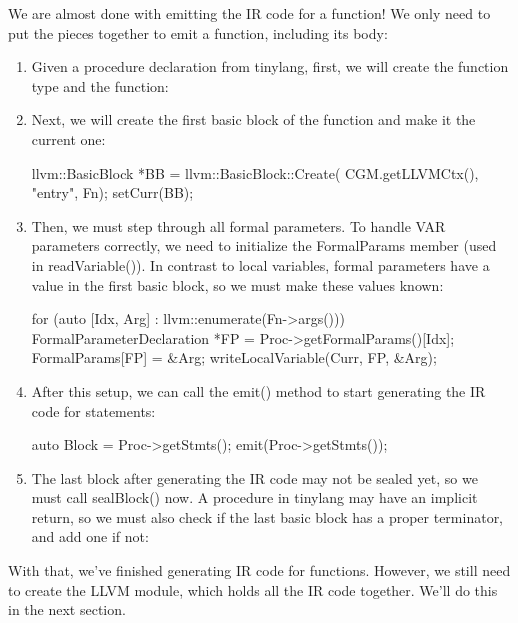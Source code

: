 We are almost done with emitting the IR code for a function! We only need to put the pieces together to emit a function, including its body:

\begin{enumerate}
\item
Given a procedure declaration from tinylang, first, we will create the function type and the function:

\begin{cpp}
void CGProcedure::run(ProcedureDeclaration *Proc) {
    this->Proc = Proc;
    Fty = createFunctionType(Proc);
    Fn = createFunction(Proc, Fty);
\end{cpp}

\item
Next, we will create the first basic block of the function and make it the current one:

\begin{cpp}
    llvm::BasicBlock *BB = llvm::BasicBlock::Create(
        CGM.getLLVMCtx(), "entry", Fn);
    setCurr(BB);
\end{cpp}

\item
Then, we must step through all formal parameters. To handle VAR parameters correctly, we need to initialize the FormalParams member (used in readVariable()). In contrast to local variables, formal parameters have a value in the first basic block, so we must make these values known:

\begin{cpp}
    for (auto [Idx, Arg] : llvm::enumerate(Fn->args())) {
        FormalParameterDeclaration *FP =
            Proc->getFormalParams()[Idx];
        FormalParams[FP] = &Arg;
        writeLocalVariable(Curr, FP, &Arg);
    }
\end{cpp}

\item
After this setup, we can call the emit() method to start generating the IR code for statements:

\begin{cpp}
    auto Block = Proc->getStmts();
    emit(Proc->getStmts());
\end{cpp}

\item
The last block after generating the IR code may not be sealed yet, so we must call sealBlock() now. A procedure in tinylang may have an implicit return, so we must also check if the last basic block has a proper terminator, and add one if not:

\begin{cpp}
    if (!Curr->getTerminator()) {
        Builder.CreateRetVoid();
    }
    sealBlock(Curr);
}
\end{cpp}

\end{enumerate}

With that, we’ve finished generating IR code for functions. However, we still need to create the LLVM module, which holds all the IR code together. We’ll do this in the next section.








